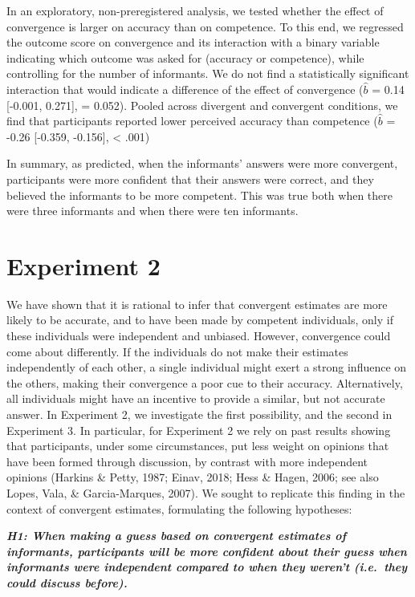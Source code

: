 \documentclass[
  doc,floatsintext]{apa6}
\begin{document}
In an exploratory, non-preregistered analysis, we tested whether the effect of convergence is larger on accuracy than on competence. To this end, we regressed the outcome score on convergence and its interaction with a binary variable indicating which outcome was asked for (accuracy or competence), while controlling for the number of informants. We do not find a statistically significant interaction that would indicate a difference of the effect of convergence (\(\hat{b}\) = 0.14 {[}-0.001, 0.271{]}, = 0.052). Pooled across divergent and convergent conditions, we find that participants reported lower perceived accuracy than competence (\(\hat{b}\) = -0.26 {[}-0.359, -0.156{]}, \textless{} .001)

In summary, as predicted, when the informants' answers were more convergent, participants were more confident that their answers were correct, and they believed the informants to be more competent. This was true both when there were three informants and when there were ten informants.

\section{Experiment 2}\label{experiment-2}

We have shown that it is rational to infer that convergent estimates are more likely to be accurate, and to have been made by competent individuals, only if these individuals were independent and unbiased. However, convergence could come about differently. If the individuals do not make their estimates independently of each other, a single individual might exert a strong influence on the others, making their convergence a poor cue to their accuracy. Alternatively, all individuals might have an incentive to provide a similar, but not accurate answer. In Experiment 2, we investigate the first possibility, and the second in Experiment 3. In particular, for Experiment 2 we rely on past results showing that participants, under some circumstances, put less weight on opinions that have been formed through discussion, by contrast with more independent opinions (Harkins \& Petty, 1987; Einav, 2018; Hess \& Hagen, 2006; see also Lopes, Vala, \& Garcia-Marques, 2007). We sought to replicate this finding in the context of convergent estimates, formulating the following hypotheses:

\textbf{\emph{H1: When making a guess based on convergent estimates of informants, participants will be more confident about their guess when informants were independent compared to when they weren't (i.e.~they could discuss before).}}
\end{document}
